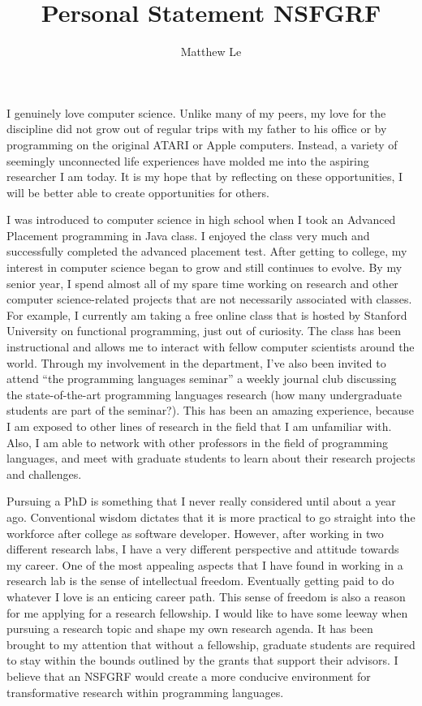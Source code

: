\documentclass[a4paper,12pt]{article}
\title{Personal Statement NSFGRF}
\author{Matthew Le}
\begin{document}
\maketitle
I genuinely love computer science. Unlike many of my peers, my love for the discipline did not grow out of regular trips with my father to his office or by programming on the original ATARI or Apple computers. Instead, a variety of seemingly unconnected life experiences have molded me into the aspiring researcher I am today. It is my hope that by reflecting on these opportunities, I will be better able to create opportunities for others.

I was introduced to computer science in high school when I took an Advanced Placement programming in Java class. I enjoyed the class very much and successfully completed the advanced placement test. After getting to college, my interest in computer science began to grow and still continues to evolve. By my senior year, I spend almost all of my spare time working on research and other computer science-related projects that are not necessarily associated with classes. For example, I currently am taking a free online class that is hosted by Stanford University on functional programming, just out of curiosity. The class has been instructional and allows me to interact with fellow computer scientists around the world.  Through my involvement in the department, I've also been invited to attend ``the programming languages seminar'' a weekly journal club discussing the state-of-the-art programming languages research (how many undergraduate students are part of the seminar?). This has been an amazing experience,  because I am exposed to other lines of research in the field that I am unfamiliar with. Also, I am able to network with other professors in the field of programming languages, and meet with graduate students to learn about their research projects and challenges. \newline

Pursuing a PhD is something that I never really considered until about a year ago. Conventional wisdom dictates that it is  more practical to go straight into the workforce after college as software developer. However, after working in two different research labs, I have a very different perspective and attitude towards my career. One of the most appealing aspects that I have found in working in a research lab is the sense of intellectual freedom.  Eventually getting paid to do whatever I love is an enticing career path. This sense of freedom is also a reason for me applying for a research fellowship. I would like to have some leeway when pursuing a research topic and shape my own research agenda. It has been brought to my attention that without a fellowship, graduate students are required to stay within the bounds outlined by the grants that support their advisors. I believe that an NSFGRF would create a more conducive environment for transformative research within programming languages.
\newline
\end{document}
